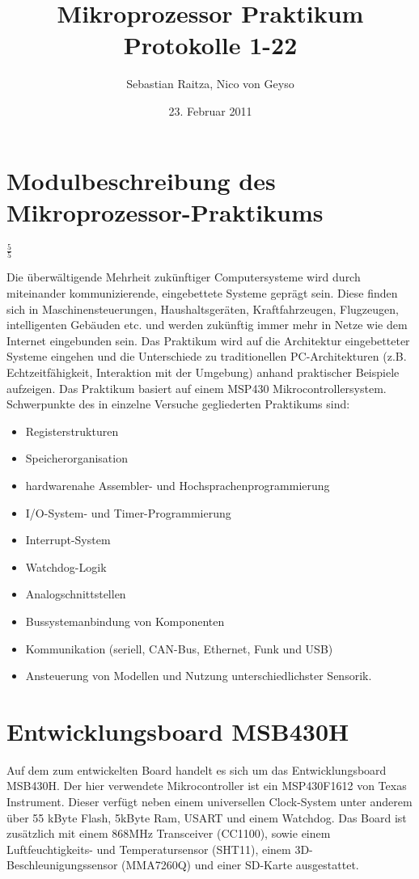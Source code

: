 \documentclass[11pt,german]{scrartcl}
\title{Mikroprozessor Praktikum\\Protokolle 1-22}
\author{Sebastian Raitza, Nico von Geyso}
\date{23. Februar 2011}
\begin{document}
\maketitle


\section{Modulbeschreibung des Mikroprozessor-Praktikums}

$\frac{5}{5}$

Die überwältigende Mehrheit zukünftiger Computersysteme wird durch miteinander kommunizierende, eingebettete Systeme geprägt sein.
Diese finden sich in Maschinensteuerungen, Haushaltsgeräten, Kraftfahrzeugen, Flugzeugen, intelligenten Gebäuden etc. und
werden zukünftig immer mehr in Netze wie dem Internet eingebunden sein.
Das Praktikum wird auf die Architektur eingebetteter Systeme eingehen und die Unterschiede zu traditionellen PC-Architekturen
(z.B. Echtzeitfähigkeit, Interaktion mit der Umgebung) anhand praktischer Beispiele aufzeigen.
Das Praktikum basiert auf einem MSP430 Mikrocontrollersystem.
Schwerpunkte des in einzelne Versuche gegliederten Praktikums sind:
\begin{itemize}
    \item Registerstrukturen
    \item Speicherorganisation
    \item hardwarenahe Assembler- und Hochsprachenprogrammierung
    \item I/O-System- und Timer-Programmierung
    \item Interrupt-System
    \item Watchdog-Logik
    \item Analogschnittstellen
    \item Bussystemanbindung von Komponenten
    \item Kommunikation (seriell, CAN-Bus, Ethernet, Funk und USB)
    \item Ansteuerung von Modellen und Nutzung unterschiedlichster Sensorik.
\end{itemize}


\section{Entwicklungsboard MSB430H}
Auf dem zum entwickelten Board handelt es sich um das Entwicklungsboard MSB430H.
Der hier verwendete Mikrocontroller ist ein MSP430F1612 von Texas Instrument.
Dieser verfügt neben einem universellen Clock-System unter anderem über 55 kByte Flash, 5kByte Ram, USART und einem Watchdog.
Das Board ist zusätzlich mit einem 868MHz Transceiver (CC1100),
sowie einem Luftfeuchtigkeits- und Temperatursensor (SHT11), einem 3D-Beschleunigungssensor (MMA7260Q)
und einer SD-Karte ausgestattet.
\end{document}
